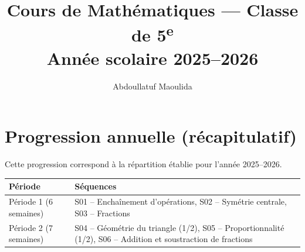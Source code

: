 \documentclass[12pt,a4paper]{book}
\title{Cours de Mathématiques — Classe de 5\textsuperscript{e}\\[0.4em]\large Année scolaire 2025–2026}
\author{Abdoullatuf Maoulida}
\begin{document}
\maketitle
\tableofcontents
\cleardoublepage



\cleardoublepage
\appendix
\chapter{Progression annuelle (récapitulatif)}
Cette progression correspond à la répartition établie pour l'année 2025–2026.

\begin{center}
\begin{tabular}{|l|l|}
\hline
\textbf{Période} & \textbf{Séquences}\\ \hline
Période 1 (6 semaines) & S01 -- Enchaînement d'opérations, S02 -- Symétrie centrale, S03 -- Fractions\\ \hline
Période 2 (7 semaines) & S04 -- Géométrie du triangle (1/2), S05 -- Proportionnalité (1/2), S06 -- Addition et soustraction de fractions\\ \hline
\end{tabular}
\end{center}
\end{document}
